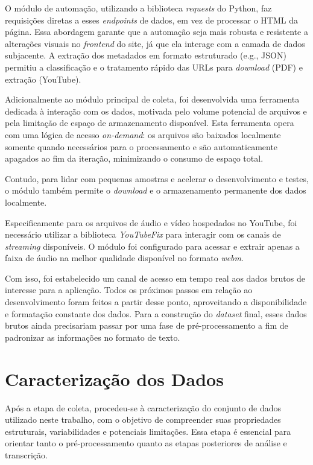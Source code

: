 O módulo de automação, utilizando a biblioteca \textit{requests} do Python, faz requisições diretas a esses \textit{endpoints} de dados, em vez de processar o HTML da página. Essa abordagem garante que a automação seja mais robusta e resistente a alterações visuais no \textit{frontend} do site, já que ela interage com a camada de dados subjacente. A extração dos metadados em formato estruturado (e.g., JSON) permitiu a classificação e o tratamento rápido das URLs para \textit{download} (PDF) e extração (YouTube). 

Adicionalmente ao módulo principal de coleta, foi desenvolvida uma ferramenta dedicada à interação com os dados, motivada pelo volume potencial de arquivos e pela limitação de espaço de armazenamento disponível. Esta ferramenta opera com uma lógica de acesso \textit{on-demand}: os arquivos são baixados localmente somente quando necessários para o processamento e são automaticamente apagados ao fim da iteração, minimizando o consumo de espaço total.

Contudo, para lidar com pequenas amostras e acelerar o desenvolvimento e testes, o módulo também permite o \textit{download} e o armazenamento permanente dos dados localmente.

Especificamente para os arquivos de áudio e vídeo hospedados no YouTube, foi necessário utilizar a biblioteca \textit{YouTubeFix} para interagir com os canais de \textit{streaming} disponíveis. O módulo foi configurado para acessar e extrair apenas a faixa de áudio na melhor qualidade disponível no formato \textit{webm}.

Com isso, foi estabelecido um canal de acesso em tempo real aos dados brutos de interesse para a aplicação. Todos os próximos passos em relação ao desenvolvimento foram feitos a partir desse ponto, aproveitando a disponibilidade e formatação constante dos dados. Para a construção do \textit{dataset} final, esses dados brutos ainda precisariam passar por uma fase de pré-processamento a fim de padronizar as informações no formato de texto.


\section{Caracterização dos Dados}
\label{sec:caracterizacao-dados}

Após a etapa de coleta, procedeu-se à caracterização do conjunto de dados utilizado neste trabalho, com o objetivo de compreender suas propriedades estruturais, variabilidades e potenciais limitações. Essa etapa é essencial para orientar tanto o pré-processamento quanto as etapas posteriores de análise e transcrição.

